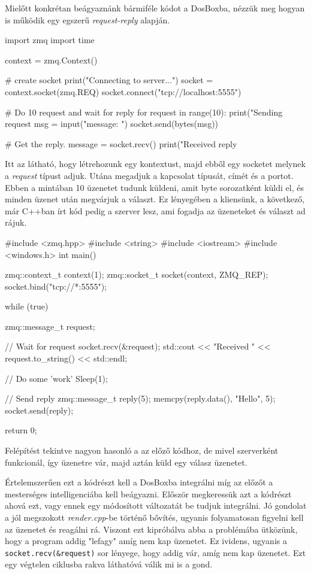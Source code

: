 Mielőtt konkrétan beágyaznánk bármiféle kódot a DosBoxba, nézzük meg hogyan is működik egy egszerű \textit{request-reply} alapján.
\begin{python}
import zmq
import time

context = zmq.Context()

#  create socket
print("Connecting to server...")
socket = context.socket(zmq.REQ)
socket.connect("tcp://localhost:5555")

#  Do 10 request and wait for reply
for request in range(10):
    print("Sending request %
    msg = input("message: ")
    socket.send(bytes(msg))

    
    #  Get the reply.
    message = socket.recv()
    print("Received reply %
\end{python}
Itt az látható, hogy létrehozunk egy kontextust, majd ebből egy socketet melynek a \textit{request} típust adjuk. 
Utána megadjuk a kapcsolat típusát, címét és a portot. Ebben a mintában 10 üzenetet tudunk küldeni, amit byte sorozatként küldi el, és minden üzenet után megvárjuk a választ. Ez lényegében a kliensünk, a következő, már C++ban írt kód pedig a szerver lesz, ami fogadja az üzeneteket és választ ad rájuk.
\begin{cpp}
#include <zmq.hpp>
#include <string>
#include <iostream>
#include <windows.h>
int main()
{
    zmq::context_t context(1);
    zmq::socket_t socket(context, ZMQ_REP);
    socket.bind("tcp://*:5555");

    while (true) {
        zmq::message_t request;

        //  Wait for request
        socket.recv(&request);
        std::cout << "Received " << request.to_string() << std::endl;

        //  Do some 'work'
        Sleep(1);

        //  Send reply 
        zmq::message_t reply(5);
        memcpy(reply.data(), "Hello", 5);
        socket.send(reply);
    }
    return 0;
}
\end{cpp}
Felépítést tekintve nagyon hasonló a az előző kódhoz, de mivel szerverként funkcionál, így üzenetre vár, majd aztán küld egy válasz üzenetet. 

Értelemszerűen ezt a kódrészt kell a DosBoxba integrálni míg az előzőt a mesterséges intelligenciába kell beágyazni. Először megkeressük azt a kódrészt ahová ezt, vagy ennek egy módosított változatát be tudjuk integrálni. Jó gondolat a jól megszokott \textit{render.cpp}-be történő bővítés, ugyanis folyamatosan figyelni kell az üzenetet és reagálni rá. Viszont ezt kipróbálva abba a problémába ütközünk, hogy a program addig "lefagy" amíg nem kap üzenetet. Ez ividens, ugyanis a \verb|socket.recv(&request)| sor lényege, hogy addig vár, amíg nem kap üzenetet. Ezt egy végtelen ciklusba rakva láthatóvá válik mi is a gond.

